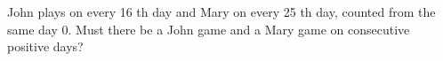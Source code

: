 John plays on every 16 th day and Mary on every 25 th day, counted from the same day 0. Must there be a John game and a Mary game on consecutive positive days?
